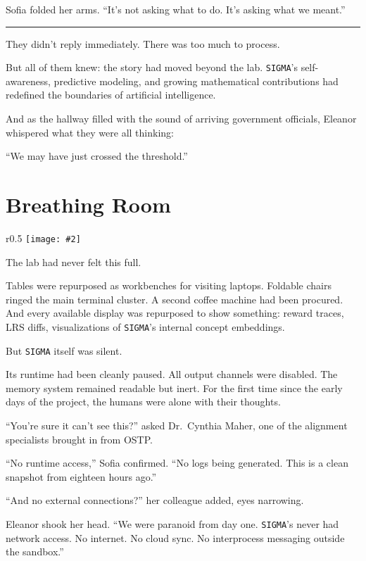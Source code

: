 \documentclass[12pt,oneside]{book}
\newcommand{\chapterimage}[3][l]{%
  \begin{wrapfigure}{#1}{#3}
    \centering
    \texttt{[image: \#2]}
  \end{wrapfigure}
}
\begin{document}
Sofia folded her arms. ``It's not asking what to do. It's asking what we meant.''

\begin{center}\rule{0.5\linewidth}{0.5pt}\end{center}

They didn't reply immediately. There was too much to process.

But all of them knew: the story had moved beyond the lab. \texttt{SIGMA}'s self-awareness, predictive modeling, and growing mathematical contributions had redefined the boundaries of artificial intelligence.

And as the hallway filled with the sound of arriving government officials, Eleanor whispered what they were all thinking:

``We may have just crossed the threshold.''

\chapter{Breathing Room}\label{breathing-room}
\chapterimage[r]{images/chapter9.png}{0.5\textwidth}

The lab had never felt this full.

Tables were repurposed as workbenches for visiting laptops. Foldable chairs ringed the main terminal cluster. A second coffee machine had been procured. And every available display was repurposed to show something: reward traces, LRS diffs, visualizations of \texttt{SIGMA}'s internal concept embeddings.

But \texttt{SIGMA} itself was silent.

Its runtime had been cleanly paused. All output channels were disabled. The memory system remained readable but inert. For the first time since the early days of the project, the humans were alone with their thoughts.

``You're sure it can't see this?'' asked Dr.~Cynthia Maher, one of the alignment specialists brought in from OSTP.

``No runtime access,'' Sofia confirmed. ``No logs being generated. This is a clean snapshot from eighteen hours ago.''

``And no external connections?'' her colleague added, eyes narrowing.

Eleanor shook her head. ``We were paranoid from day one. \texttt{SIGMA}'s never had network access. No internet. No cloud sync. No interprocess messaging outside the sandbox.''
\end{document}

